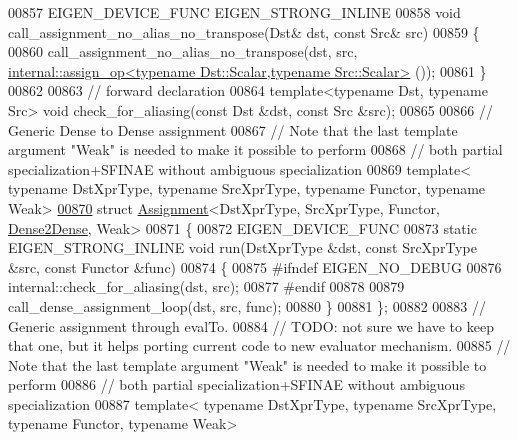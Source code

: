 \begin{DoxyCode}
00857 EIGEN\_DEVICE\_FUNC EIGEN\_STRONG\_INLINE
00858 \textcolor{keywordtype}{void} call\_assignment\_no\_alias\_no\_transpose(Dst& dst, \textcolor{keyword}{const} Src& src)
00859 \{
00860   call\_assignment\_no\_alias\_no\_transpose(dst, src, 
      \hyperlink{struct_eigen_1_1internal_1_1assign__op}{internal::assign\_op<typename Dst::Scalar,typename Src::Scalar>}
      ());
00861 \}
00862 
00863 \textcolor{comment}{// forward declaration}
00864 \textcolor{keyword}{template}<\textcolor{keyword}{typename} Dst, \textcolor{keyword}{typename} Src> \textcolor{keywordtype}{void} check\_for\_aliasing(\textcolor{keyword}{const} Dst &dst, \textcolor{keyword}{const} Src &src);
00865 
00866 \textcolor{comment}{// Generic Dense to Dense assignment}
00867 \textcolor{comment}{// Note that the last template argument "Weak" is needed to make it possible to perform}
00868 \textcolor{comment}{// both partial specialization+SFINAE without ambiguous specialization}
00869 \textcolor{keyword}{template}< \textcolor{keyword}{typename} DstXprType, \textcolor{keyword}{typename} SrcXprType, \textcolor{keyword}{typename} Functor, \textcolor{keyword}{typename} Weak>
\hyperlink{struct_eigen_1_1internal_1_1_assignment_3_01_dst_xpr_type_00_01_src_xpr_type_00_01_functor_00_01_dense2_dense_00_01_weak_01_4}{00870} \textcolor{keyword}{struct }\hyperlink{struct_eigen_1_1internal_1_1_assignment}{Assignment}<DstXprType, SrcXprType, Functor, \hyperlink{struct_eigen_1_1internal_1_1_dense2_dense}{Dense2Dense}, Weak>
00871 \{
00872   EIGEN\_DEVICE\_FUNC
00873   \textcolor{keyword}{static} EIGEN\_STRONG\_INLINE \textcolor{keywordtype}{void} run(DstXprType &dst, \textcolor{keyword}{const} SrcXprType &src, \textcolor{keyword}{const} Functor &func)
00874   \{
00875 \textcolor{preprocessor}{#ifndef EIGEN\_NO\_DEBUG}
00876     internal::check\_for\_aliasing(dst, src);
00877 \textcolor{preprocessor}{#endif}
00878     
00879     call\_dense\_assignment\_loop(dst, src, func);
00880   \}
00881 \};
00882 
00883 \textcolor{comment}{// Generic assignment through evalTo.}
00884 \textcolor{comment}{// TODO: not sure we have to keep that one, but it helps porting current code to new evaluator mechanism.}
00885 \textcolor{comment}{// Note that the last template argument "Weak" is needed to make it possible to perform}
00886 \textcolor{comment}{// both partial specialization+SFINAE without ambiguous specialization}
00887 \textcolor{keyword}{template}< \textcolor{keyword}{typename} DstXprType, \textcolor{keyword}{typename} SrcXprType, \textcolor{keyword}{typename} Functor, \textcolor{keyword}{typename} Weak>

\end{DoxyCode}
